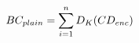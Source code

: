 \begin{equation}
    BC_{plain} = \sum_{i=1}^{n} D_K(CD_{enc})
    \label{eq:fhe_bc_decrypt}
    \title{Foo}
\end{equation}
